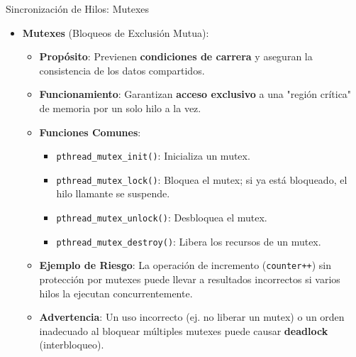 \documentclass{beamer}
\begin{document}
\begin{frame}{Sincronización de Hilos: Mutexes}
    \begin{itemize}
        \item \textbf{Mutexes} (Bloqueos de Exclusión Mutua):
        \begin{itemize}
            \item \textbf{Propósito}: Previenen \textbf{condiciones de carrera} y aseguran la consistencia de los datos compartidos.
            \item \textbf{Funcionamiento}: Garantizan \textbf{acceso exclusivo} a una "región crítica" de memoria por un solo hilo a la vez.
            \item \textbf{Funciones Comunes}:
                \begin{itemize}
                    \item \texttt{pthread\_mutex\_init()}: Inicializa un mutex.
                    \item \texttt{pthread\_mutex\_lock()}: Bloquea el mutex; si ya está bloqueado, el hilo llamante se suspende.
                    \item \texttt{pthread\_mutex\_unlock()}: Desbloquea el mutex.
                    \item \texttt{pthread\_mutex\_destroy()}: Libera los recursos de un mutex.
                \end{itemize}
            \item \textbf{Ejemplo de Riesgo}: La operación de incremento (\texttt{counter++}) sin protección por mutexes puede llevar a resultados incorrectos si varios hilos la ejecutan concurrentemente.
            \item \textbf{Advertencia}: Un uso incorrecto (ej. no liberar un mutex) o un orden inadecuado al bloquear múltiples mutexes puede causar \textbf{deadlock} (interbloqueo).
        \end{itemize}
    \end{itemize}
\end{frame}
\end{document}
